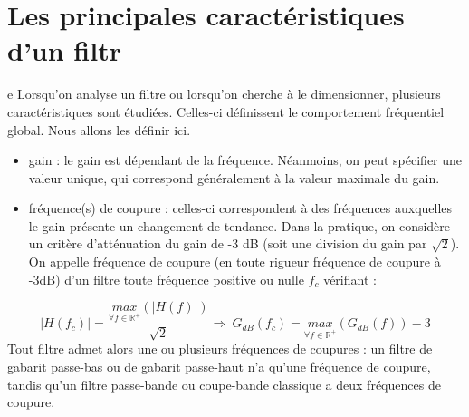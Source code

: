 \documentclass[]{report}
\begin{document}
	\section{Les principales caractéristiques d'un filtr}e
	Lorsqu'on analyse un filtre ou lorsqu'on cherche à le dimensionner, plusieurs caractéristiques sont étudiées. Celles-ci définissent le comportement fréquentiel global. Nous allons les définir ici. 
	\begin{itemize}
		\item gain : le gain est dépendant de la fréquence. Néanmoins, on peut spécifier une valeur unique, qui correspond généralement à la valeur maximale du gain.
		\item fréquence(s) de coupure : celles-ci correspondent à des fréquences auxquelles le gain présente un changement de tendance. Dans la pratique, on considère un critère d'atténuation du gain de -3 dB (soit une division du gain par $\sqrt{2}$). On appelle fréquence de coupure (en toute rigueur fréquence de coupure à -3dB) d’un filtre toute fréquence positive ou nulle $f_{c}$ vérifiant :
	\end{itemize}
	\begin{equation}\label{key}
	|H(f_{c})|=\frac{\underset{\forall f \in \mathbb{R}^{+}}{max}(|H(f)|)}{\sqrt{2}} \Rightarrow~G_{dB}(f_{c})=\underset{\forall f \in \mathbb{R}^{+}}{max}(G_{dB}(f))-3
	\end{equation}
	Tout filtre admet alors une ou plusieurs fréquences de coupures : un filtre de gabarit passe-bas ou de gabarit passe-haut n’a qu’une fréquence de coupure, tandis qu’un filtre passe-bande ou coupe-bande classique a deux fréquences de coupure.
\end{document}
